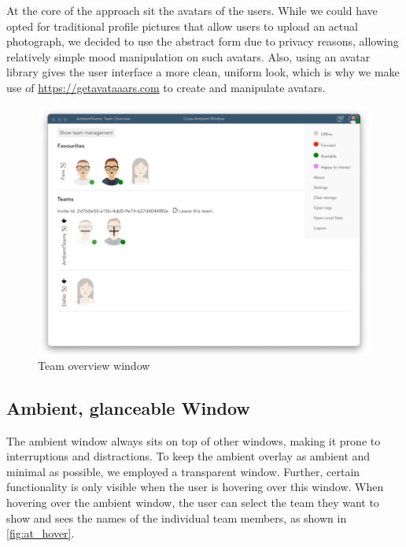 At the core of the approach sit the avatars of the users. While we could have opted for traditional profile pictures that allow users to upload an actual photograph, we decided to use the abstract form due to privacy reasons, allowing relatively simple mood manipulation on such avatars. Also, using an avatar library gives the user interface a more clean, uniform look, which is why
we make use of \url{https://getavataaars.com} to create and manipulate avatars.

\begin{figure}[h]
    \centering
    \includegraphics[width=.8\linewidth]{./images/AT_overview.png}
    \caption{Team overview window }
    \label{fig:at_overview}
\end{figure}

\subsection{Ambient, glanceable Window}
The ambient window always sits on top of other windows, making it prone to interruptions and distractions. To keep the ambient overlay as ambient and minimal as possible, we employed a transparent window. Further, certain functionality is only visible when the user is hovering over this window. When hovering over the ambient window, the user can select the team they want to show and sees the names of the individual team members, as shown in \autoref{fig:at_hover}.


